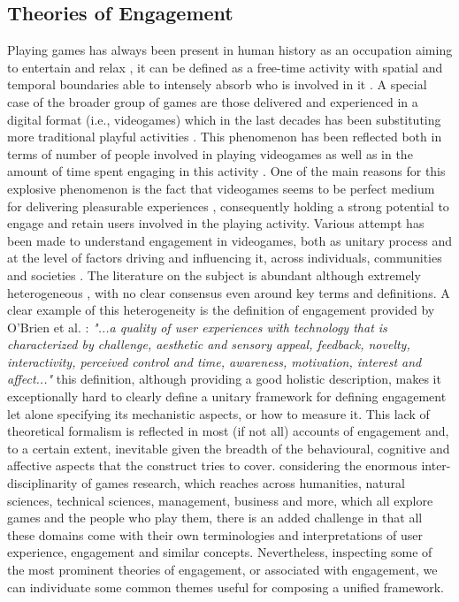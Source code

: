\subsection{Theories of Engagement}
\label{factors_engagement}
Playing games has always been present in human history as an occupation aiming to entertain and relax \cite{connolly2012systematic}, it can be defined as a free-time activity with spatial and temporal boundaries able to intensely absorb who is involved in it \cite{connolly2012systematic}. A special case of the broader group of games are those delivered and experienced in a digital format (i.e., videogames) which in the last decades has been substituting more traditional playful activities \cite{boyle2012engagement,connolly2012systematic}. This phenomenon has been reflected both in terms of number of people involved in playing videogames as well as in the amount of time spent engaging in this activity \cite{boyle2012engagement}. One of the main reasons for this explosive phenomenon is the fact that videogames seems to be perfect medium for delivering pleasurable experiences \cite{boyle2012engagement}, consequently holding a strong potential to engage and retain users involved in the playing activity. Various attempt has been made to understand engagement in videogames, both as unitary process and at the level of factors driving and influencing it, across individuals, communities and societies \cite{boyle2012engagement}. The literature on the subject is abundant although extremely heterogeneous \cite{boyle2012engagement}, with no clear consensus even around key terms and definitions. A clear example of this heterogeneity is the definition of engagement provided by O'Brien et al. \cite{o2008user}:
\textit{"...a quality of user experiences with technology that is characterized by challenge, aesthetic and sensory appeal, feedback, novelty, interactivity, perceived control and time, awareness, motivation, interest and affect..."}
this definition, although providing a good holistic description, makes it exceptionally hard to clearly define a unitary framework for defining engagement let alone specifying its mechanistic aspects, or how to measure it. This lack of theoretical formalism is reflected in most (if not all) accounts of engagement and, to a certain extent, inevitable given the breadth of the behavioural, cognitive and affective aspects that the construct tries to cover. considering the enormous inter-disciplinarity of games research, which reaches across humanities, natural sciences, technical sciences, management, business and more, which all explore games and the people who play them, there is an added challenge in that all these domains come with their own terminologies and interpretations of user experience, engagement and similar concepts. Nevertheless, inspecting some of the most prominent theories of engagement, or associated with engagement, we can individuate some common themes useful for composing a unified framework.

